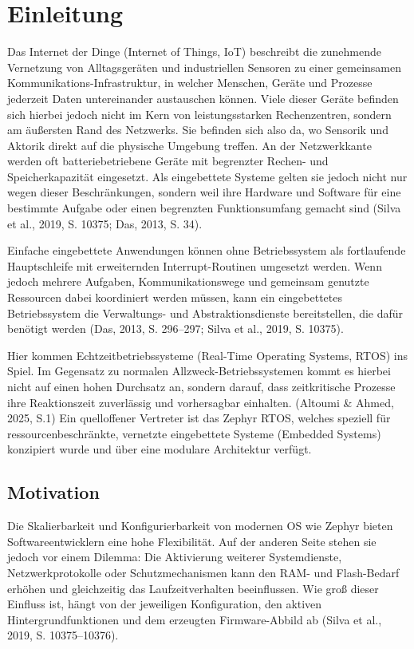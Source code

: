 \chapter{Einleitung}
\label{ch:einleitung}

Das Internet der Dinge (Internet of Things, IoT) beschreibt die zunehmende Vernetzung von Alltagsger{\"a}ten und industriellen Sensoren zu einer gemeinsamen Kommunikations-Infrastruktur, in welcher Menschen, Ger{\"a}te und Prozesse jederzeit Daten untereinander austauschen k{\"o}nnen. Viele dieser Ger{\"a}te befinden sich hierbei jedoch nicht im Kern von leistungsstarken Rechenzentren, sondern am {\"a}u{\ss}ersten Rand des Netzwerks. Sie befinden sich also da, wo Sensorik und Aktorik direkt auf die physische Umgebung treffen. An der Netzwerkkante werden oft batteriebetriebene Ger{\"a}te mit begrenzter Rechen- und Speicherkapazit{\"a}t eingesetzt. Als eingebettete Systeme gelten sie jedoch nicht nur wegen dieser Beschr{\"a}nkungen, sondern weil ihre Hardware und Software f{\"u}r eine bestimmte Aufgabe oder einen begrenzten Funktionsumfang gemacht sind (Silva et al., 2019, S. 10375; Das, 2013, S. 34).

Einfache eingebettete Anwendungen k{\"o}nnen ohne Betriebssystem als fortlaufende Hauptschleife mit erweiternden Interrupt-Routinen umgesetzt werden. Wenn jedoch mehrere Aufgaben, Kommunikationswege und gemeinsam genutzte Ressourcen dabei koordiniert werden m{\"u}ssen, kann ein eingebettetes Betriebssystem die Verwaltungs- und Abstraktionsdienste bereitstellen, die daf{\"u}r ben{\"o}tigt werden (Das, 2013, S. 296--297; Silva et al., 2019, S. 10375).

Hier kommen Echtzeitbetriebssysteme (Real-Time Operating Systems, RTOS) ins Spiel. Im Gegensatz zu normalen Allzweck-Betriebssystemen kommt es hierbei nicht auf einen hohen Durchsatz an, sondern darauf, dass zeitkritische Prozesse ihre Reaktionszeit zuverl{\"a}ssig und vorhersagbar einhalten. (Altoumi \& Ahmed, 2025, S.1) Ein quelloffener Vertreter ist das Zephyr RTOS, welches speziell f{\"u}r ressourcenbeschr{\"a}nkte, vernetzte eingebettete Systeme (Embedded Systems) konzipiert wurde und {\"u}ber eine modulare Architektur verf{\"u}gt.


\section{Motivation}
Die Skalierbarkeit und Konfigurierbarkeit von modernen OS wie Zephyr bieten Softwareentwicklern eine hohe Flexibilit{\"a}t. Auf der anderen Seite stehen sie jedoch vor einem Dilemma: Die Aktivierung weiterer Systemdienste, Netzwerkprotokolle oder Schutzmechanismen kann den RAM- und Flash-Bedarf erh{\"o}hen und gleichzeitig das Laufzeitverhalten beeinflussen. Wie gro{\ss} dieser Einfluss ist, h{\"a}ngt von der jeweiligen Konfiguration, den aktiven Hintergrundfunktionen und dem erzeugten Firmware-Abbild ab (Silva et al., 2019, S. 10375--10376).

